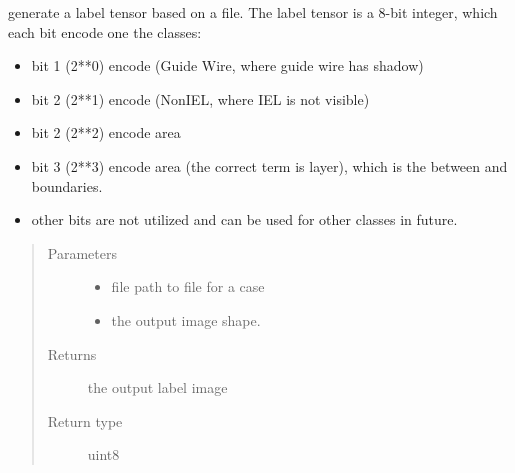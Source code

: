 \documentclass[letterpaper,10pt,english]{sphinxmanual}
\begin{document}
\begin{fulllineitems}
\label{\detokenize{index:util.read_oct_roi_file.read_oct_roi_file}}
generate a label tensor based on a  file.  The label tensor is a 8-bit integer, which each bit
encode one the classes:
\begin{itemize}
\item {} 
bit 1 (2**0) encode  (Guide Wire, where guide wire has shadow)

\item {} 
bit 2 (2**1) encode  (NonIEL, where IEL is not visible)

\item {} 
bit 2  (2**2) encode  area

\item {} 
bit 3  (2**3) encode  area (the correct term is  layer), which is the between  and 
boundaries.

\item {} 
other bits are not utilized and can be used for other classes in future.

\end{itemize}
\begin{quote}\begin{description}
\item[{Parameters}] \leavevmode\begin{itemize}
\item {} 
 \textendash{} file path to  file for a case

\item {} 
 \textendash{} the output image shape.

\end{itemize}

\item[{Returns}] \leavevmode
the output label image

\item[{Return type}] \leavevmode
uint8

\end{description}\end{quote}



\end{fulllineitems}
\end{document}
